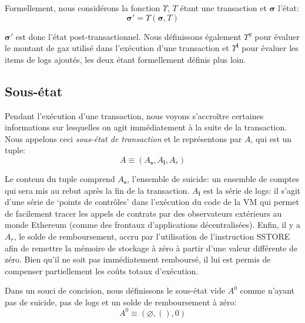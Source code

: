 \documentclass[9pt,oneside]{amsart}
\begin{document}
\begin{multicols}{2}
Formellement, nous considérons la fonction $\Upsilon$, $T$ étant une transaction et $\boldsymbol{\sigma}$ l'état:
\begin{equation}
\boldsymbol{\sigma}' = \Upsilon(\boldsymbol{\sigma}, T)
\end{equation}

$\boldsymbol{\sigma}'$ est donc l'état post-transactionnel. Nous définissons également $\Upsilon^g$ pour évaluer le montant de gaz utilisé dans l'exécution d'une transaction et $\Upsilon^\mathbf{l}$ pour évaluer les items de logs ajoutés, les deux étant formellement définis plus loin.

\subsection{Sous-état}
Pendant l'exécution d'une transaction, nous voyons s'accroître certaines informations sur lesquelles on agit immédiatement à la suite de la transaction. Nous appelons ceci \textit{sous-état de transaction} et le représentons par $A$, qui est un tuple:
\begin{equation}
A \equiv (A_\mathbf{s}, A_\mathbf{l}, A_r)
\end{equation}

Le contenu du tuple comprend $A_\mathbf{s}$, l'ensemble de suicide: un ensemble de comptes qui sera mis au rebut après la fin de la transaction. $A_\mathbf{l}$ est la série de logs: il s'agit d'une série de `points de contrôles' dans l'exécution du code de la VM qui permet de facilement tracer les appels de contrats par des observateurs extérieurs au monde Ethereum (comme des frontaux d'applications décentralisées). Enfin, il y a $A_r$, le solde de remboursement, accru par l'utilisation de l'instruction {\small SSTORE} afin de remettre la mémoire de stockage à zéro à partir d'une valeur différente de zéro. Bien qu'il ne soit pas immédiatement remboursé, il lui est permis de compenser partiellement les coûts totaux d'exécution.

Dans un souci de concision, nous définissons le sous-état vide $A^0$ comme n'ayant pas de suicide, pas de logs et un solde de remboursement à zéro:
\begin{equation}
A^0 \equiv (\varnothing, (), 0)
\end{equation}


\end{multicols}
\end{document}
